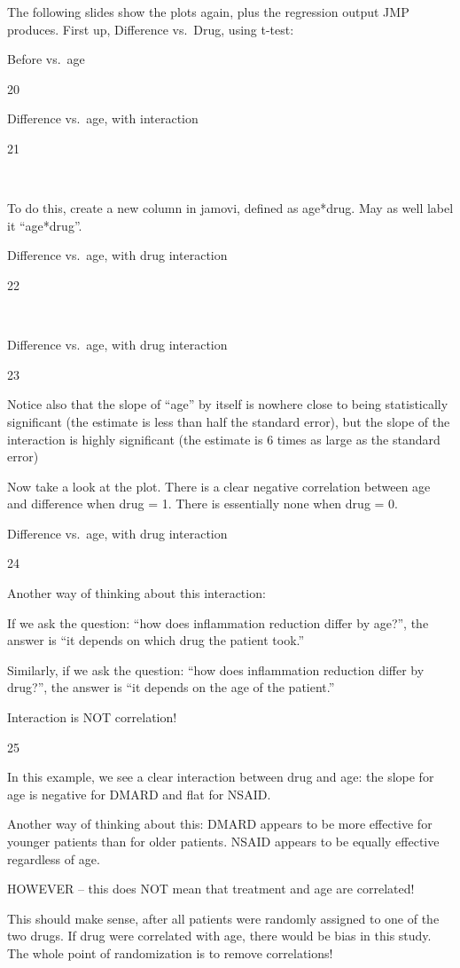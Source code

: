 \documentclass[
  letterpaper,
  DIV=11,
  numbers=noendperiod]{scrreprt}
\begin{document}
The following slides show the plots again, plus the regression output
JMP produces. First up, Difference vs.~Drug, using t-test:

Before vs.~age

20

Difference vs.~age, with interaction

21

~

To do this, create a new column in jamovi, defined as age*drug. May as
well label it ``age*drug''.

Difference vs.~age, with drug interaction

22

~

Difference vs.~age, with drug interaction

23

Notice also that the slope of ``age'' by itself is nowhere close to
being statistically significant (the estimate is less than half the
standard error), but the slope of the interaction is highly significant
(the estimate is 6 times as large as the standard error)

Now take a look at the plot. There is a clear negative correlation
between age and difference when drug = 1. There is essentially none when
drug = 0.

Difference vs.~age, with drug interaction

24

Another way of thinking about this interaction:

If we ask the question: ``how does inflammation reduction differ by
age?'', the answer is ``it depends on which drug the patient took.''

Similarly, if we ask the question: ``how does inflammation reduction
differ by drug?'', the answer is ``it depends on the age of the
patient.''

Interaction is NOT correlation!

25

In this example, we see a clear interaction between drug and age: the
slope for age is negative for DMARD and flat for NSAID.

Another way of thinking about this: DMARD appears to be more effective
for younger patients than for older patients. NSAID appears to be
equally effective regardless of age.

HOWEVER -- this does NOT mean that treatment and age are correlated!

This should make sense, after all patients were randomly assigned to one
of the two drugs. If drug were correlated with age, there would be bias
in this study. The whole point of randomization is to remove
correlations!
\end{document}
